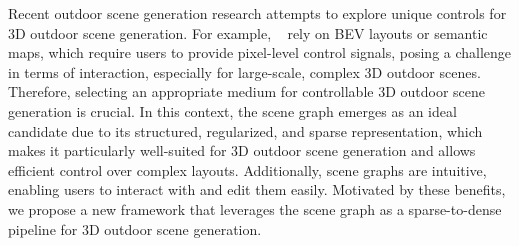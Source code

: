 Recent outdoor scene generation research attempts to explore unique controls for 3D outdoor scene generation. For example, 
~\cite{zhang2024urban, deng2023citygen} rely on BEV layouts or semantic maps, which require users to provide pixel-level control signals, posing a challenge in terms of interaction, especially for large-scale, complex 3D outdoor scenes. Therefore, selecting an appropriate medium for controllable 3D outdoor scene generation is crucial. In this context, the scene graph emerges as an ideal candidate due to its structured, regularized, and sparse representation, which makes it particularly well-suited for 3D outdoor scene generation and allows efficient control over complex layouts.
Additionally, scene graphs are intuitive, enabling users to interact with and edit them easily. Motivated by these benefits, we propose a new framework that leverages the scene graph as a sparse-to-dense pipeline for 3D outdoor scene generation.

%


